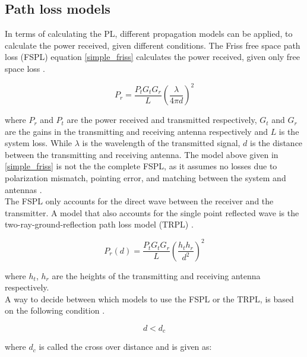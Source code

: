 \subsection{Path loss models}

In terms of calculating the PL, different propagation models can be applied, to calculate the power received, given different conditions. The Friss free space path loss (FSPL) equation  \eqref{simple_friss} calculates the power received, given only free space loss \cite{Chong}.

\begin{equation}
P_r = \frac{P_t G_t G_r}{L} \left(\frac{\lambda}{4 \pi d}\right)^2
\label{simple_friss}
\end{equation}

where $P_{r}$ and $P_{t}$ are the power received and transmitted respectively, $G_t$ and $G_r$ are the gains in the transmitting and receiving antenna respectively and $L$ is the system loss. While $\lambda$ is the wavelength of the transmitted signal, $d$ is the distance between the transmitting and receiving antenna. The model above given in \eqref{simple_friss} is not the the complete FSPL, as it assumes no losses due to polarization mismatch, pointing error, and matching between the system and antennas \cite{full_friss}. \\

The FSPL only accounts for the direct wave between the receiver and the transmitter. A model that also accounts for the single point reflected wave is the two-ray-ground-reflection path loss model (TRPL) \cite{two_ray}. %

\begin{equation}
P_r(d) = \frac{P_t G_t G_r }{L}\left(\frac{h_t h_r}{d^2}\right)^2
\label{two_ray_model}
\end{equation}

where $h_t$, $h_r$ are the heights of the transmitting and receiving antenna respectively. \\


A way to decide between which models to use the FSPL or the TRPL, is based on the following condition \cite{two_ray}. 

\begin{equation}
d < d_{c}
\label{two_ray_cond}
\end{equation}

where $d_{c}$ is called the cross over distance and is given as:

